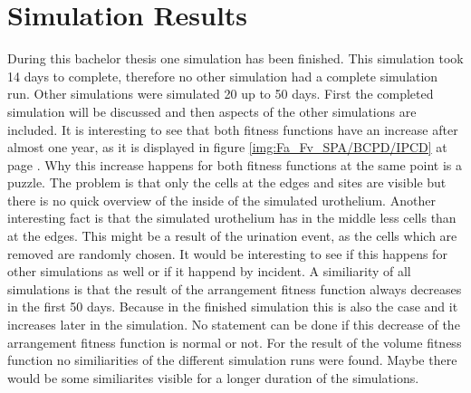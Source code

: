\section{Simulation Results}\label{sec:SimulationResults}
During this bachelor thesis one simulation has been finished. This simulation took 14 days to complete, therefore no other simulation had a complete simulation run. Other simulations were simulated 20 up to 50 days. First the completed simulation will be discussed and then aspects of the other simulations are included. \newline
It is interesting to see that both fitness functions have an increase after almost one year, as it is displayed in figure \ref{img:Fa_Fv_SPA/BCPD/IPCD} at page \pageref{img:Fa_Fv_SPA/BCPD/IPCD}. Why this increase happens for both fitness functions at the same point is a puzzle. The problem is that only the cells at the edges and sites are visible but there is no quick overview of the inside of the simulated urothelium. Another interesting fact is that the simulated urothelium has in the middle less cells than at the edges. This might be a result of the urination event, as the cells which are removed are randomly chosen. It would be interesting to see if this happens for other simulations as well or if it happend by incident. \newline
A similiarity of all simulations is that the result of the arrangement fitness function always decreases in the first 50 days. Because in the finished simulation this is also the case and it increases later in the simulation. No statement can be done if this decrease of the arrangement fitness function is normal or not. For the result of the volume fitness function no similiarities of the different simulation runs were found. Maybe there would be some similiarites visible for a longer duration of the simulations.

